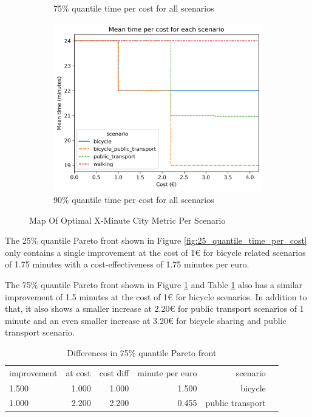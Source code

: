 \begin{figure}
\begin{subfigure}[b]{0.48\textwidth}
         \caption{75\% quantile time per cost for all scenarios}
         \label{fig:75_quantile_time_per_cost}
     \end{subfigure}
     \hfill
     \begin{subfigure}[b]{0.48\textwidth}
         \centering
         \includegraphics[width=\textwidth]{Figures/results/metric_cost/quantile_90_time_per_cost_for_each_scenario_without_car.png}
         \caption{90\% quantile time per cost for all scenarios}
         \label{fig:90_quantile_time_per_cost}
     \end{subfigure}
        \caption{Map Of Optimal X-Minute City Metric Per Scenario}
        \label{fig:quantile_time_per_cost}
\end{figure}

The 25\% quantile Pareto front shown in Figure \ref{fig:25_quantile_time_per_cost} only contains a single improvement at the cost of 1€ for bicycle related scenarios of 1.75 minutes with a cost-effectiveness of 1.75 minutes per euro.


The 75\% quantile Pareto front shown in Figure \ref{fig:75_quantile_time_per_cost} and Table \ref{tab:differences_in_75_quantile_pareto_front} also has a similar improvement of 1.5 minutes at the cost of 1€ for bicycle scenarios.
In addition to that, it also shows a smaller increase at 2.20€ for public transport scenarios of 1 minute and an even smaller increase at 3.20€ for bicycle sharing and public transport scenario.

\begin{table}
  \caption{Differences in 75\% quantile Pareto front}
  \label{tab:differences_in_75_quantile_pareto_front}
  \begin{center}
    \begin{tabular}{lrrrrl}
     improvement & at cost & cost diff & minute per euro & scenario \\
     1.500 & 1.000 & 1.000 & 1.500 & bicycle \\
     1.000 & 2.200 & 2.200 & 0.455 & public transport \\
    \end{tabular}
  \end{center}
\end{table}


